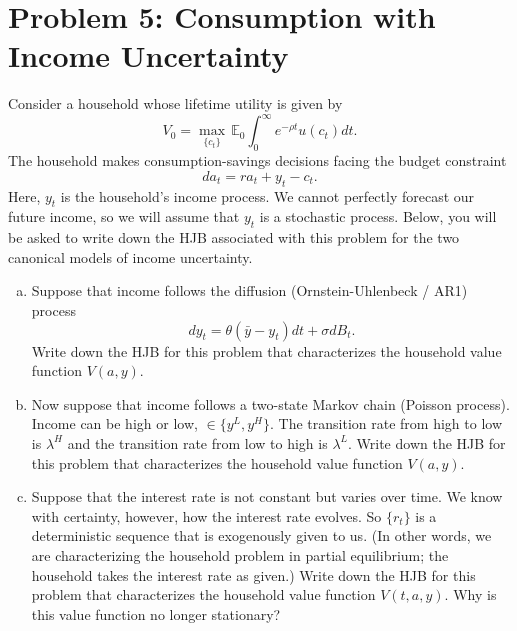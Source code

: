 \documentclass[11pt]{extarticle}
\theoremstyle{plain}
\theoremstyle{definition}
\begin{document}
\vspace{5mm}
\section*{Problem 5: Consumption with Income Uncertainty}

Consider a household whose lifetime utility is given by 
\begin{equation*}
	V_0 = \max_{ \{c_t\} } \, \mathbb E_0 \int_0^\infty e^{- \rho t} u(c_t) dt.
\end{equation*}
The household makes consumption-savings decisions facing the budget constraint 
\begin{equation*}
	da_t = r a_t + y_t - c_t.
\end{equation*}
Here, $y_t$ is the household's income process. We cannot perfectly forecast our future income, so we will assume that $y_t$ is a stochastic process. Below, you will be asked to write down the HJB associated with this problem for the two canonical models of income uncertainty.

\vspace{4mm}
\begin{enumerate}[(a)]
\item Suppose that income follows the diffusion (Ornstein-Uhlenbeck / AR1) process
\begin{equation*}
	dy_t = \theta(\bar y - y_t) dt + \sigma dB_t.
\end{equation*}
Write down the HJB for this problem that characterizes the household value function $V(a, y)$. 

\item Now suppose that income follows a two-state Markov chain (Poisson process). Income can be high or low, $\in \{y^L, y^H\}$. The transition rate from high to low is $\lambda^H$ and the transition rate from low to high is $\lambda^L$. Write down the HJB for this problem that characterizes the household value function $V(a, y)$. 

\item Suppose that the interest rate is not constant but varies over time. We know with certainty, however, how the interest rate evolves. So $\{r_t\}$ is a deterministic sequence that is exogenously given to us. (In other words, we are characterizing the household problem in partial equilibrium; the household takes the interest rate as given.) Write down the HJB for this problem that characterizes the household value function $V(t, a, y)$. Why is this value function no longer stationary?

\end{enumerate}
\end{document}
